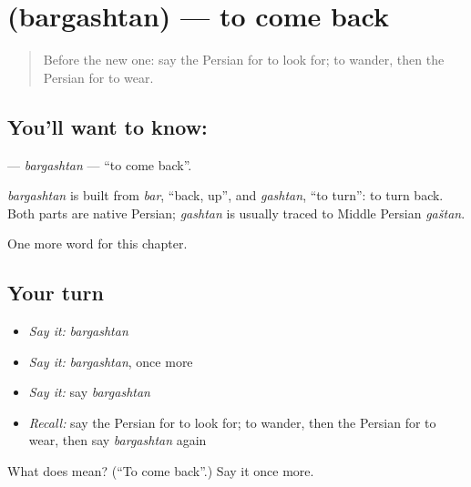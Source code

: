 \section[\texorpdfstring{\fa{برگشتن} (bargashtan)}{برگشتن (bargashtan)}]{ (bargashtan) — to come back}

\label{lesson:FA-C39-bargashtan}



\begin{quote}
Before the new one: say the Persian for to look for; to wander, then the Persian for to wear.
\end{quote}

\subsection*{You'll want to know: }
\textbf{} — \emph{bargashtan} — \textquotedblleft{}to come back\textquotedblright{}.

\begin{cousinweb}
\emph{bargashtan} is built from \emph{bar}, \textquotedblleft{}back, up\textquotedblright{}, and \emph{gashtan}, \textquotedblleft{}to turn\textquotedblright{}: to turn back. Both parts are native Persian; \emph{gashtan} is usually traced to Middle Persian \emph{gaštan}.
\end{cousinweb}

\begin{grammarlens}[title={What you've built}]
One more word for this chapter.
\end{grammarlens}

\subsection*{Your turn}
\begin{itemize}
\raggedright
  \item \emph{Say it:} \emph{bargashtan}
  \item \emph{Say it:} \emph{bargashtan}, once more
  \item \emph{Say it:} say \emph{bargashtan}
  \item \emph{Recall:} say the Persian for to look for; to wander, then the Persian for to wear, then say \emph{bargashtan} again
\end{itemize}

\begin{tcolorbox}[breakable,colback=teal!4,colframe=teal!35!black,title={Before you move on}]
What does  mean? (\textquotedblleft{}To come back\textquotedblright{}.) Say it once more.
\end{tcolorbox}
